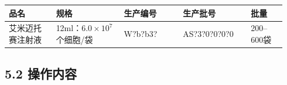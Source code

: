 \documentclass[UTF8,10pt,a4paper,fontset=fandol]{ctexart}
\newcommand{\fieldvalue}[1]{#1}
\newcommand{\handwritten}[1]{#1}
\begin{document}
\begin{center}
\begin{tabular}{|p{0.16\linewidth}|p{0.23\linewidth}|p{0.20\linewidth}|p{0.23\linewidth}|p{0.12\linewidth}|}
\hline
\centering 品名 & \centering 规格 & \centering 生产编号 & \centering 生产批号 & \centering 批量\\
\hline
艾米迈托赛注射液
&
12ml：$6.0\times10^{7}$个细胞/袋
&
\fieldvalue{\handwritten{W?b?b3?}}
&
\fieldvalue{\handwritten{AS?3?0?0?0?0}}
&
200--600袋
\\
\hline
\end{tabular}
\end{center}

\subsection*{5.2 操作内容}
\end{document}

